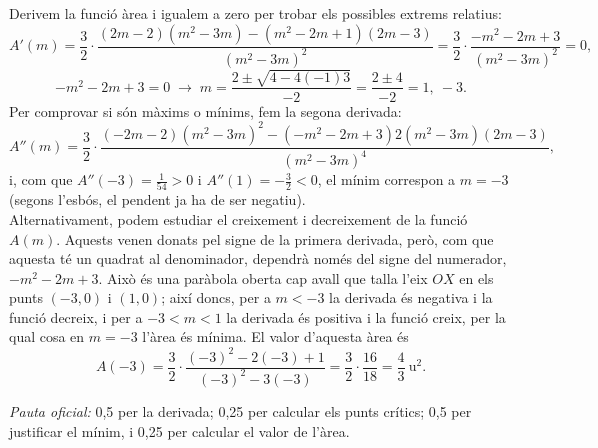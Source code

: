 \begin{apartats}
\begin{solucio}
Derivem la funció àrea i igualem a zero per trobar els possibles extrems relatius:
\[
A'(m)=\frac32\cdot\frac{(2m-2)\left(m^2-3m\right)-\left(m^2-2m+1\right)(2m-3)}{\left(m^2-3m\right)^2}
=\frac32\cdot\frac{-m^2-2m+3}{\left(m^2-3m\right)^2}=0,
\]
\[
-m^2-2m+3=0\;\rightarrow\;m=\frac{2\pm\sqrt{4-4(-1)3}}{-2}=\frac{2\pm4}{-2}=1,\ -3 .
\]
Per comprovar si són màxims o mínims, fem la segona derivada:
\[
A''(m)=\frac32\cdot\frac{(-2m-2)\left(m^2-3m\right)^2-\left(-m^2-2m+3\right)2\left(m^2-3m\right)(2m-3)}{\left(m^2-3m\right)^4},
\]
i, com que $A''(-3)=\frac1{54}>0$ i $A''(1)=-\frac32<0$, el mínim correspon a $m=-3$ (segons l'esbós, el
pendent ja ha de ser negatiu).\\
Alternativament, podem estudiar el creixement i decreixement de la funció $A(m)$. Aquests venen donats pel
signe de la primera derivada, però, com que aquesta té un quadrat al denominador, dependrà només del signe
del numerador, $-m^2-2m+3$. Això és una paràbola oberta cap avall que talla l'eix $OX$ en els punts
$(-3,0)$ i $(1,0)$; així doncs, per a $m<-3$ la derivada és negativa i la funció decreix, i per a $-3<m<1$
la derivada és positiva i la funció creix, per la qual cosa en $m=-3$ l'àrea és mínima. El valor d'aquesta
àrea és
\[
A(-3)=\frac32\cdot\frac{(-3)^2-2(-3)+1}{(-3)^2-3(-3)}=\frac32\cdot\frac{16}{18}=\frac43\ \text{u}^2 .
\]

\textit{Pauta oficial:} 0,5 per la derivada; 0,25 per calcular els punts crítics; 0,5 per justificar el mínim,
i 0,25 per calcular el valor de l'àrea.
\end{solucio}

\end{apartats}
